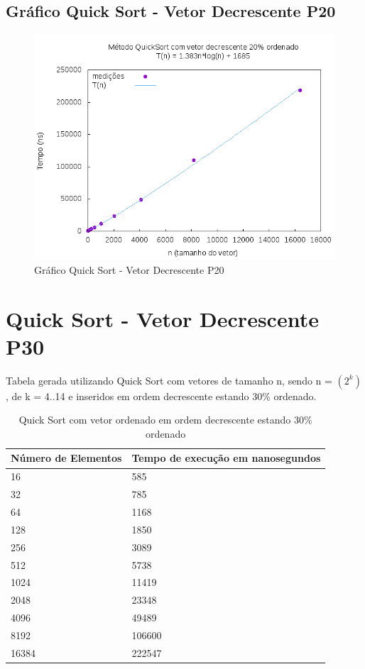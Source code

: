 \documentclass[12pt,a4paper,twoside]{report}
\begin{document}
\subsection{Gráfico Quick Sort - Vetor Decrescente P20}
\begin{figure}[H]
    \centering
    \includegraphics[width=0.7\linewidth]{graficos/QuickSort/vIntDecrescenteP20/vIntDecrescenteP20.png}
  \caption{Gráfico Quick Sort - Vetor Decrescente P20}
\end{figure}

\section{Quick Sort - Vetor Decrescente P30}
Tabela gerada utilizando Quick Sort com vetores de tamanho n, sendo n = $(2^k)$, de k = 4..14 e inseridos em ordem decrescente estando 30\% ordenado.
\begin{table}[H]
\centering
\caption{Quick Sort com vetor ordenado em ordem decrescente estando 30\% ordenado}
\label{my-label}
\begin{tabular}{|l|l|}
\hline
\multicolumn{1}{|c|}{\textbf{Número de Elementos}} & \multicolumn{1}{c|}{\textbf{Tempo de execução em nanosegundos}} \\ \hline
16 & 585 \\ \hline
32 & 785 \\ \hline
64 & 1168 \\ \hline
128 & 1850 \\ \hline
256 & 3089 \\ \hline
512 & 5738 \\ \hline
1024 & 11419 \\ \hline
2048 & 23348 \\ \hline
4096 & 49489 \\ \hline
8192 & 106600 \\ \hline
16384 & 222547 \\ \hline
\end{tabular}
\end{table}
\end{document}
